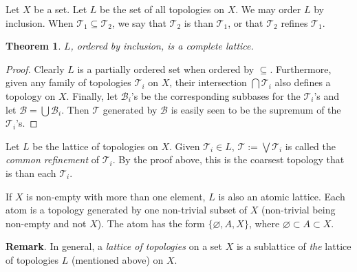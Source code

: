 \documentclass[12pt]{article}
\newtheorem{thm}{Theorem}
\begin{document}
Let $X$ be a set.  Let $L$ be the set of all topologies on $X$.  We may order $L$ by inclusion.  When $\mathcal{T}_1\subseteq \mathcal{T}_2$, we say that $\mathcal{T}_2$ is  than $\mathcal{T}_1$, or that $\mathcal{T}_2$ refines $\mathcal{T}_1$.

\begin{thm}  $L$, ordered by inclusion, is a complete lattice. \end{thm}
\begin{proof}
Clearly $L$ is a partially ordered set when ordered by $\subseteq$.  Furthermore, given any family of topologies $\mathcal{T}_i$ on $X$, their intersection $\bigcap \mathcal{T}_i$ also defines a topology on $X$.  Finally, let $\mathcal{B}_i$'s be the corresponding subbases for the $\mathcal{T}_i$'s and let $\mathcal{B}=\bigcup \mathcal{B}_i$.  Then $\mathcal{T}$ generated by $\mathcal{B}$ is easily seen to be the supremum of the $\mathcal{T}_i$'s.
\end{proof}

Let $L$ be the lattice of topologies on $X$.  Given $\mathcal{T}_i\in L$, $\mathcal{T}:=\bigvee \mathcal{T}_i$ is called the \emph{common refinement} of $\mathcal{T}_i$.  By the proof above, this is the coarsest topology that is  than each $\mathcal{T}_i$.

If $X$ is non-empty with more than one element, $L$ is also an atomic lattice.  Each atom is a topology generated by one non-trivial subset of $X$ (non-trivial being non-empty and not $X$).  The atom has the form $\lbrace \varnothing, A, X\rbrace$, where $\varnothing \subset A\subset X$.

\textbf{Remark}.  In general, a \emph{lattice of topologies} on a set $X$ is a sublattice of \emph{the} lattice of topologies $L$ (mentioned above) on $X$.
\end{document}
